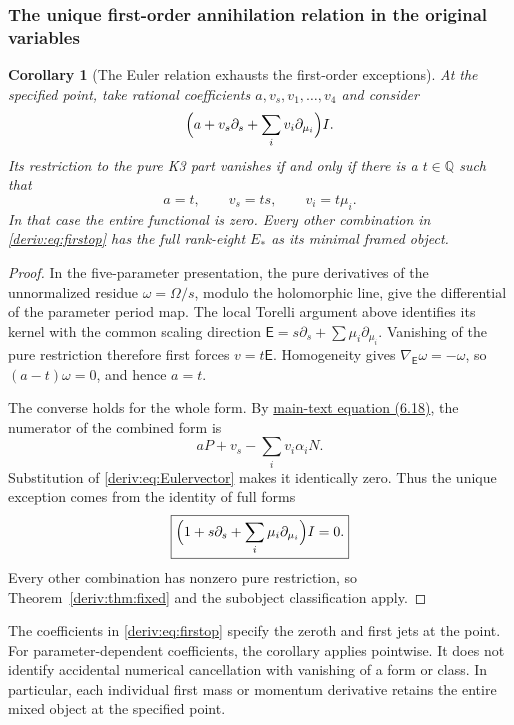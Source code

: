\documentclass[11pt,a4paper,oneside]{article}
\theoremstyle{plain}
\newtheorem{corollary}[theorem]{Corollary}
\theoremstyle{definition}
\theoremstyle{remark}
\newcommand{\Q}{\mathbb Q}
\numberwithin{equation}{section}
\newcommand{\otherref}[2]{\href{#1.pdf}{#2}}
\begin{document}
\subsubsection{The unique first-order annihilation relation in the original variables}
\begin{corollary}[The Euler relation exhausts the first-order exceptions]\label{deriv:cor:Euler}
At the specified point, take rational coefficients $a,v_s,v_1,\ldots,v_4$ and consider
\begin{equation}\label{deriv:eq:firstop}
 \Bigl(a+v_s\partial_s+\sum_iv_i\partial_{\mu_i}\Bigr)I.
\end{equation}
Its restriction to the pure K3 part vanishes if and only if there is a $t\in\Q$ such that
\begin{equation}\label{deriv:eq:Eulervector}
 a=t,\qquad v_s=ts,\qquad v_i=t\mu_i.
\end{equation}
In that case the entire functional is zero. Every other combination in \eqref{deriv:eq:firstop} has the full rank-eight $E_*$ as its minimal framed object.
\end{corollary}
\begin{proof}
In the five-parameter presentation, the pure derivatives of the unnormalized residue $\omega=\Omega/s$, modulo the holomorphic line, give the differential of the parameter period map. The local Torelli argument above identifies its kernel with the common scaling direction $\mathsf E=s\partial_s+\sum\mu_i\partial_{\mu_i}$. Vanishing of the pure restriction therefore first forces $v=t\mathsf E$. Homogeneity gives $\nabla_{\mathsf E}\omega=-\omega$, so $(a-t)\omega=0$, and hence $a=t$.

The converse holds for the whole form. By \otherref{feynman_periods_long_paper_en}{main-text equation (6.18)}, the numerator of the combined form is
\[
 aP+v_s-\sum_i v_i\alpha_iN.
\]
Substitution of \eqref{deriv:eq:Eulervector} makes it identically zero. Thus the unique exception comes from the identity of full forms
\begin{equation}\label{deriv:eq:Euler}
 \boxed{\Bigl(1+s\partial_s+\sum_i\mu_i\partial_{\mu_i}\Bigr)I=0.}
\end{equation}
Every other combination has nonzero pure restriction, so Theorem~\ref{deriv:thm:fixed} and the subobject classification apply.
\end{proof}
The coefficients in \eqref{deriv:eq:firstop} specify the zeroth and first jets at the point. For parameter-dependent coefficients, the corollary applies pointwise. It does not identify accidental numerical cancellation with vanishing of a form or class. In particular, each individual first mass or momentum derivative retains the entire mixed object at the specified point.
\endgroup
\end{document}
